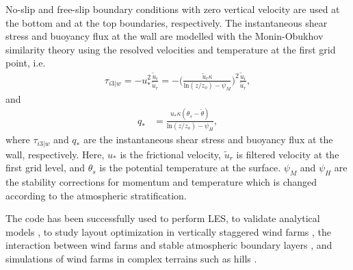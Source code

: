 \documentclass[output=paper,colorlinks,citecolor=brown]{langscibook}
\begin{document}
No-slip and free-slip boundary conditions with zero vertical velocity are used at the bottom and at the top boundaries, respectively. The instantaneous shear stress and buoyancy flux at the wall are modelled with the Monin-Obukhov similarity theory \citep{moe84} using the resolved velocities and temperature at the first grid point, i.e.\
%
\begin{align}
\tau_{i3|w}=-{u_{*}^2}\frac{\widetilde{u}_i}{\widetilde{u}_r}=-\Bigg(\frac{\widetilde{u}_r\kappa}{\text{ln}(z/z_o)-\psi_{M}}\Bigg)^2\frac{\widetilde{u}_i}{\widetilde{u}_r},\label{eqn28}
\end{align} 
and
% 
\begin{align} 
q_{*}&=\frac{u_{*}\kappa(\theta_s-\widetilde{\theta})}{\text{ln}(z/z_o)-\psi_{H}},\label{eqn29}
\end{align}
%
where $\tau_{i3|w}$ and $q_{*}$ are the instantaneous shear stress and buoyancy flux at the wall, respectively. Here, $u_*$ is the frictional velocity, $\widetilde{u}_r$ is filtered velocity at the first grid level, and $\theta_s$ is the potential temperature at the surface. $\psi_M$ and $\psi_H$ are the stability corrections for momentum and temperature which is changed according to the atmospheric stratification.

The code has been successfully used to perform LES, to validate analytical models \cite{ste16}, to study layout optimization in vertically staggered wind farms \citep{zha18, zha19}, the interaction between wind farms and stable atmospheric boundary layers \citep{nag19, nag20b}, and simulations of wind farms in complex terrains such as hills \citep{liu20}. 
\end{document}
